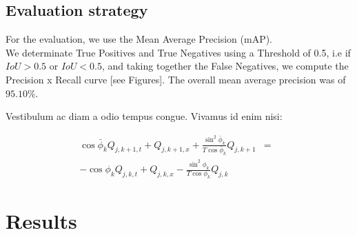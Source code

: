 \documentclass[a0,landscape]{a0poster}
\begin{document}
\begin{multicols}{3}
\subsection*{Evaluation strategy}
For the evaluation, we use the Mean Average Precision (mAP). \\  
We determinate True Positives and True Negatives using a Threshold of 0.5, i.e if $IoU > 0.5$ or $IoU < 0.5$, and taking together the False Negatives, we compute the Precision x Recall curve [see Figures].  The overall mean average precision was of $95.10 \%$.


Vestibulum ac diam a odio tempus congue. Vivamus id enim nisi:

\begin{eqnarray}
\cos\bar{\phi}_k Q_{j,k+1,t} + Q_{j,k+1,x}+\frac{\sin^2\bar{\phi}_k}{T\cos\bar{\phi}_k} Q_{j,k+1} &=&\nonumber\\ 
-\cos\phi_k Q_{j,k,t} + Q_{j,k,x}-\frac{\sin^2\phi_k}{T\cos\phi_k} Q_{j,k}\label{edgek}
\end{eqnarray}



\section*{Results}


\end{multicols}
\end{document}

